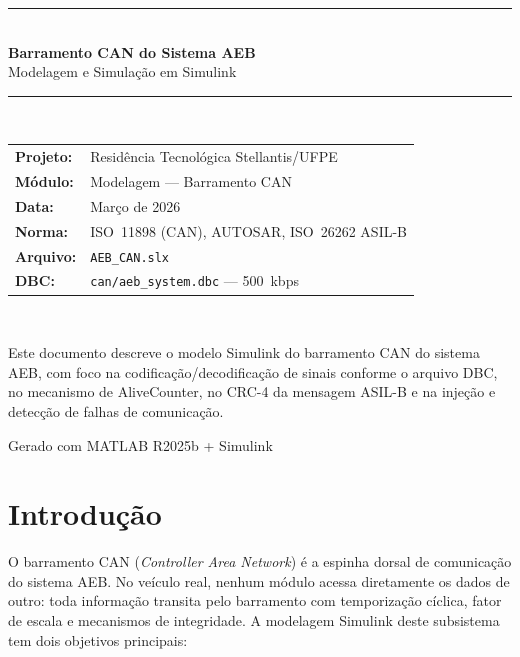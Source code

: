 \documentclass[12pt,a4paper]{article}
\begin{document}
\begin{titlepage}
  \centering
  \vspace*{1cm}
  {\color{azul}\rule{\linewidth}{2pt}}\\[0.5cm]
  {\Huge\bfseries\color{azul} Barramento CAN do Sistema AEB}\\[0.3cm]
  {\Large\color{cinza} Modelagem e Simulação em Simulink}\\[0.2cm]
  {\color{azul}\rule{\linewidth}{1pt}}\\[1cm]

  {\large
  \begin{tabular}{ll}
    \textbf{Projeto:}  & Residência Tecnológica Stellantis/UFPE\\[4pt]
    \textbf{Módulo:}   & Modelagem --- Barramento CAN\\[4pt]
    \textbf{Data:}     & Março de 2026\\[4pt]
    \textbf{Norma:}    & ISO~11898 (CAN), AUTOSAR, ISO~26262 ASIL-B\\[4pt]
    \textbf{Arquivo:}  & \texttt{AEB\_CAN.slx}\\[4pt]
    \textbf{DBC:}      & \texttt{can/aeb\_system.dbc} --- 500~kbps\\
  \end{tabular}
  }\\[1.5cm]

  \begin{tcolorbox}[notabox, width=0.85\linewidth]
    Este documento descreve o modelo Simulink do barramento CAN do sistema AEB,
    com foco na codificação/decodificação de sinais conforme o arquivo DBC,
    no mecanismo de AliveCounter, no CRC-4 da mensagem ASIL-B e na
    injeção e detecção de falhas de comunicação.
  \end{tcolorbox}

  \vfill
  {\color{cinza}\small Gerado com MATLAB R2025b + Simulink}
\end{titlepage}

\tableofcontents
\newpage

\section{Introdução}
\label{sec:intro}

O barramento CAN (\textit{Controller Area Network}) é a espinha dorsal de
comunicação do sistema AEB. No veículo real, nenhum módulo acessa diretamente
os dados de outro: toda informação transita pelo barramento com temporização
cíclica, fator de escala e mecanismos de integridade. A modelagem Simulink
deste subsistema tem dois objetivos principais:
\end{document}
